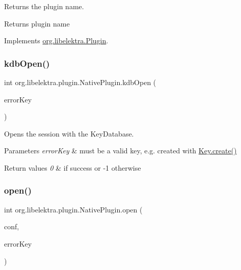 Returns the plugin name. 

\begin{DoxyReturn}{Returns}
plugin name 
\end{DoxyReturn}


Implements \mbox{\hyperlink{interfaceorg_1_1libelektra_1_1Plugin_a51be1d6efdd3542c2ae503031bd16e04}{org.\+libelektra.\+Plugin}}.

\mbox{\label{classorg_1_1libelektra_1_1plugin_1_1NativePlugin_a232c37208b79734c6be8a9f426efa56a}} 
\subsubsection{\texorpdfstring{kdbOpen()}{kdbOpen()}}
{\footnotesize\ttfamily int org.\+libelektra.\+plugin.\+Native\+Plugin.\+kdb\+Open (\begin{DoxyParamCaption}\item[{\mbox{\hyperlink{classorg_1_1libelektra_1_1Key}{Key}}}]{error\+Key }\end{DoxyParamCaption})\hspace{0.3cm}{\ttfamily [inline]}}



Opens the session with the Key\+Database. 


\begin{DoxyParams}{Parameters}
{\em error\+Key} & must be a valid key, e.\+g. created with \mbox{\hyperlink{classorg_1_1libelektra_1_1Key_af407cf43625618af4e7fb2576037fcfc}{Key.\+create()}} \\
\hline
\end{DoxyParams}

\begin{DoxyRetVals}{Return values}
{\em 0} & if success or -\/1 otherwise \\
\hline
\end{DoxyRetVals}
\mbox{\label{classorg_1_1libelektra_1_1plugin_1_1NativePlugin_a81510de92e0d65784e877bf53b89756a}} 
\subsubsection{\texorpdfstring{open()}{open()}}
{\footnotesize\ttfamily int org.\+libelektra.\+plugin.\+Native\+Plugin.\+open (\begin{DoxyParamCaption}\item[{\mbox{\hyperlink{classorg_1_1libelektra_1_1KeySet}{Key\+Set}}}]{conf,  }\item[{\mbox{\hyperlink{classorg_1_1libelektra_1_1Key}{Key}}}]{error\+Key }\end{DoxyParamCaption})\hspace{0.3cm}{\ttfamily [inline]}}



